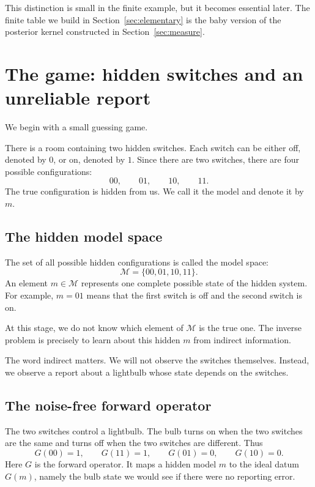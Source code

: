 \documentclass[11pt]{article}
\newcommand{\M}{\mathcal{M}}
\begin{document}
This distinction is small in the finite example, but it becomes essential later. The finite table we build in Section~\ref{sec:elementary} is the baby version of the posterior kernel constructed in Section~\ref{sec:measure}.

\section{The game: hidden switches and an unreliable report}
\label{sec:game}

We begin with a small guessing game.

There is a room containing two hidden switches. Each switch can be either off, denoted by \(0\), or on, denoted by \(1\). Since there are two switches, there are four possible configurations:
\[
    00,\qquad 01,\qquad 10,\qquad 11.
\]
The true configuration is hidden from us. We call it the model and denote it by \(m\).

\subsection{The hidden model space}

The set of all possible hidden configurations is called the model space:
\[
    \M = \{00,01,10,11\}.
\]
An element \(m\in\M\) represents one complete possible state of the hidden system. For example, \(m=01\) means that the first switch is off and the second switch is on.

At this stage, we do not know which element of \(\M\) is the true one. The inverse problem is precisely to learn about this hidden \(m\) from indirect information.

The word indirect matters. We will not observe the switches themselves. Instead, we observe a report about a lightbulb whose state depends on the switches.

\subsection{The noise-free forward operator}

The two switches control a lightbulb. The bulb turns on when the two switches are the same and turns off when the two switches are different. Thus
\[
    G(00)=1,\qquad G(11)=1,\qquad G(01)=0,\qquad G(10)=0.
\]
Here \(G\) is the forward operator. It maps a hidden model \(m\) to the ideal datum \(G(m)\), namely the bulb state we would see if there were no reporting error.
\end{document}
